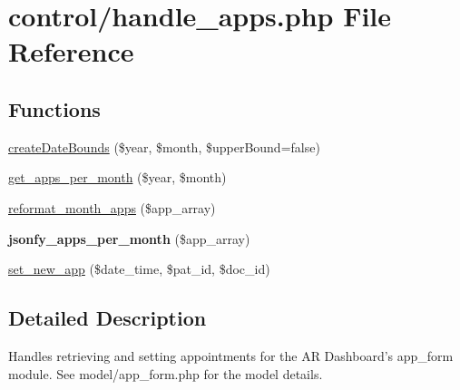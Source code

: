 \hypertarget{handle__apps_8php}{\section{control/handle\-\_\-apps.php File Reference}
\label{handle__apps_8php}
}
\subsection*{Functions}
\begin{DoxyCompactItemize}
\item 
\hyperlink{handle__apps_8php_aa7125df730591e3d6e127d0c82ecf05a}{create\-Date\-Bounds} (\$year, \$month, \$upper\-Bound=false)
\item 
\hyperlink{handle__apps_8php_ae5489b1800879e5690ee1591bcd51989}{get\-\_\-apps\-\_\-per\-\_\-month} (\$year, \$month)
\item 
\hyperlink{handle__apps_8php_a3743147b4aa5a810e2658668b7b738c3}{reformat\-\_\-month\-\_\-apps} (\$app\-\_\-array)
\item 
\hypertarget{handle__apps_8php_af939a69fecfbeb4e55fa0d83f4a4306e}{{\bfseries jsonfy\-\_\-apps\-\_\-per\-\_\-month} (\$app\-\_\-array)}\label{handle__apps_8php_af939a69fecfbeb4e55fa0d83f4a4306e}

\item 
\hyperlink{handle__apps_8php_a64d720df3ce7ec0d8dfcc6bacca5ba0d}{set\-\_\-new\-\_\-app} (\$date\-\_\-time, \$pat\-\_\-id, \$doc\-\_\-id)
\end{DoxyCompactItemize}


\subsection{Detailed Description}
Handles retrieving and setting appointments for the A\-R Dashboard's app\-\_\-form module. See model/app\-\_\-form.\-php for the model details. 

